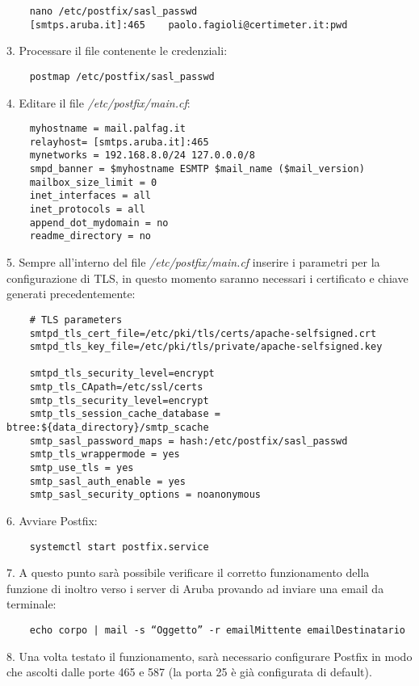 \begin{verbatim}
    nano /etc/postfix/sasl_passwd
    [smtps.aruba.it]:465    paolo.fagioli@certimeter.it:pwd
\end{verbatim}
3. Processare il file contenente le credenziali:

\begin{verbatim}
    postmap /etc/postfix/sasl_passwd
\end{verbatim}
4. Editare il file \textit{/etc/postfix/main.cf}:

\begin{verbatim}
    myhostname = mail.palfag.it
    relayhost= [smtps.aruba.it]:465
    mynetworks = 192.168.8.0/24 127.0.0.0/8
    smpd_banner = $myhostname ESMTP $mail_name ($mail_version)
    mailbox_size_limit = 0
    inet_interfaces = all
    inet_protocols = all
    append_dot_mydomain = no
    readme_directory = no
\end{verbatim}
5. Sempre all'interno del file \textit{/etc/postfix/main.cf} inserire i parametri per la configurazione di TLS,
in questo momento saranno necessari i certificato e chiave generati precedentemente:

\begin{verbatim}
    # TLS parameters
    smtpd_tls_cert_file=/etc/pki/tls/certs/apache-selfsigned.crt
    smtpd_tls_key_file=/etc/pki/tls/private/apache-selfsigned.key

    smtpd_tls_security_level=encrypt
    smtp_tls_CApath=/etc/ssl/certs
    smtp_tls_security_level=encrypt
    smtp_tls_session_cache_database = btree:${data_directory}/smtp_scache
    smtp_sasl_password_maps = hash:/etc/postfix/sasl_passwd
    smtp_tls_wrappermode = yes
    smtp_use_tls = yes
    smtp_sasl_auth_enable = yes
    smtp_sasl_security_options = noanonymous
\end{verbatim}
6. Avviare Postfix:
\begin{verbatim}
    systemctl start postfix.service
\end{verbatim}
7. A questo punto sarà possibile verificare il corretto funzionamento della funzione di inoltro verso i server di Aruba 
provando ad inviare una email da terminale:

\begin{verbatim}
    echo corpo | mail -s “Oggetto” -r emailMittente emailDestinatario 
\end{verbatim}
8. Una volta testato il funzionamento, sarà necessario configurare Postfix in modo che ascolti dalle porte 465 e 587 
(la porta 25 è già configurata di default).

